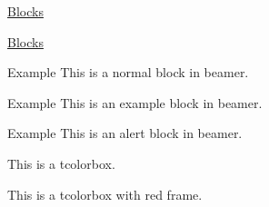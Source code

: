 \documentclass[11pt,aspectratio=43,xcolor={dvipsnames},hyperref={pdftex,pdfpagemode=UseNone,hidelinks,pdfdisplaydoctitle=true},usepdftitle=false]{ctexbeamer}
\begin{document}
\begin{frame}{\underline{Blocks}}
  \itshape\lipsum[3]
\end{frame}

\begin{frame}{\underline{Blocks}}
  \begin{block}{Example}
    This is a normal block in beamer.
  \end{block}

  \begin{exampleblock}{Example}
    This is an example block in beamer.
  \end{exampleblock}

  \begin{alertblock}{Example}
    This is an alert block in beamer.
  \end{alertblock}

  \begin{tcolorbox}
    This is a tcolorbox.
  \end{tcolorbox}

  \begin{tcolorbox}[colframe=purple!70,colback=red!10]
    This is a tcolorbox with red frame.
  \end{tcolorbox}
\end{frame}

\begin{frame}
  \begin{center}
    \Huge{}
  \end{center}
\end{frame}
\end{document}

